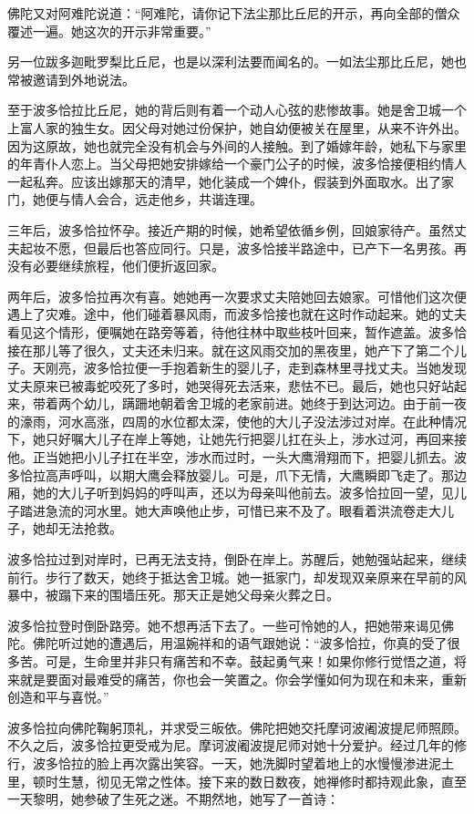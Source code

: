 \documentclass[12pt,twoside,openany]{book}
\begin{document}
佛陀又对阿难陀说道：“阿难陀，请你记下法尘那比丘尼的开示，再向全部的僧众覆述一遍。她这次的开示非常重要。”

另一位跋多迦毗罗梨比丘尼，也是以深利法要而闻名的。一如法尘那比丘尼，她也常被邀请到外地说法。

至于波多恰拉比丘尼，她的背后则有着一个动人心弦的悲惨故事。她是舍卫城一个上富人家的独生女。因父母对她过份保护，她自幼便被关在屋里，从来不许外出。因为这原故，她也就完全没有机会与外间的人接触。到了婚嫁年龄，她私下与家里的年青仆人恋上。当父母把她安排嫁给一个豪门公子的时候，波多恰接便相约情人一起私奔。应该出嫁那天的清早，她化装成一个婢仆，假装到外面取水。出了家门，她便与情人会合，远走他乡，共谐连理。

三年后，波多恰拉怀孕。接近产期的时候，她希望依循乡例，回娘家待产。虽然丈夫起妆不愿，但最后也答应同行。只是，波多恰接半路途中，已产下一名男孩。再没有必要继续旅程，他们便折返回家。

两年后，波多恰拉再次有喜。她她再一次要求丈夫陪她回去娘家。可惜他们这次便遇上了灾难。途中，他们碰着暴风雨，而波多恰接也就在这时作动起来。她的丈夫看见这个情形，便嘱她在路旁等着，待他往林中取些枝叶回来，暂作遮盖。波多恰接在那儿等了很久，丈夫还未归来。就在这风雨交加的黑夜里，她产下了第二个儿子。天刚亮，波多恰拉便一手抱着新生的婴儿子，走到森林里寻找丈夫。当她发现丈夫原来已被毒蛇咬死了多时，她哭得死去活来，悲怯不已。最后，她也只好站起来，带着两个幼儿，蹒跚地朝着舍卫城的老家前进。她终于到达河边。由于前一夜的濠雨，河水高涨，四周的水位都太深，使他的大儿子没法涉过对岸。在此种情况下，她只好嘱大儿子在岸上等她，让她先行把婴儿扛在头上，涉水过河，再回来接他。正当她把小儿子扛在半空，涉水而过时，一头大鹰滑翔而下，把婴儿抓去。波多恰拉高声呼叫，以期大鹰会释放婴儿。可是，爪下无情，大鹰瞬即飞走了。那边厢，她的大儿子听到妈妈的呼叫声，还以为母亲叫他前去。波多恰拉回一望，见儿子踏进急流的河水里。她大声唤他止步，可惜已来不及了。眼看着洪流卷走大儿子，她却无法抢救。

波多恰拉过到对岸时，已再无法支持，倒卧在岸上。苏醒后，她勉强站起来，继续前行。步行了数天，她终于抵达舍卫城。她一抵家门，却发现双亲原来在早前的风暴中，被蹋下来的围墙压死。那天正是她父母亲火葬之日。

波多恰拉登时倒卧路旁。她不想再活下去了。一些可怜她的人，把她带来谒见佛陀。佛陀听过她的遭遇后，用温婉祥和的语气跟她说：“波多恰拉，你真的受了很多苦。可是，生命里并非只有痛苦和不幸。鼓起勇气来！如果你修行觉悟之道，将来就是要面对最难受的痛苦，你也会一笑置之。你会学懂如何为现在和未来，重新创造和平与喜悦。”

波多恰拉向佛陀鞠躬顶礼，并求受三皈依。佛陀把她交托摩诃波阇波提尼师照顾。不久之后，波多恰拉更受戒为尼。摩诃波阇波提尼师对她十分爱护。经过几年的修行，波多恰拉的脸上再次露出笑容。一天，她洗脚时望着地上的水慢慢渗进泥土里，顿时生慧，彻见无常之性体。接下来的数日数夜，她禅修时都持观此象，直至一天黎明，她参破了生死之迷。不期然地，她写了一首诗：
\end{document}
